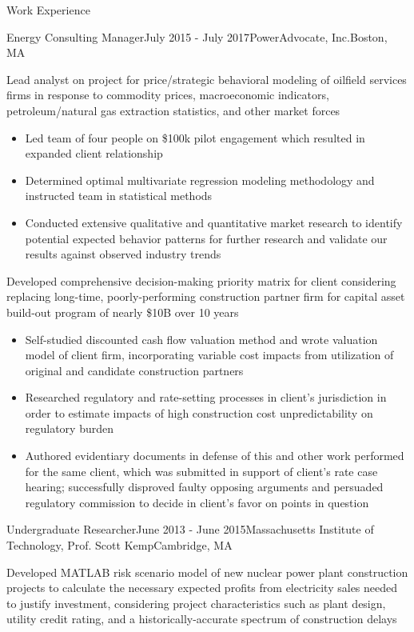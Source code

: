 \documentclass{resume} %
\begin{document}
\begin{rSection}{Work Experience}
\begin{rSubsection}{Energy Consulting Manager}{July 2015 - July 2017}{PowerAdvocate, Inc.}{Boston, MA}
  \setlength{\itemsep}{-5pt}
  \item Lead analyst on project for price/strategic behavioral modeling of oilfield services firms in response to commodity prices, macroeconomic indicators, petroleum/natural gas extraction statistics, and other market forces
  \begin{itemize}
    \item Led team of four people on \$100k pilot engagement which resulted in expanded client relationship
    \item Determined optimal multivariate regression modeling methodology and instructed team in statistical methods
    \item Conducted extensive qualitative and quantitative market research to identify potential expected behavior patterns for further research and validate our results against observed industry trends
  \end{itemize}
  \item Developed comprehensive decision-making priority matrix for client considering replacing long-time, poorly-performing construction partner firm for capital asset build-out program of nearly \$10B over 10 years
  \begin{itemize}
    \setlength{\itemsep}{-5pt}
    \item Self-studied discounted cash flow valuation method and wrote valuation model of client firm, incorporating variable cost impacts from utilization of original and candidate construction partners
    \item Researched regulatory and rate-setting processes in client's jurisdiction in order to estimate impacts of high construction cost unpredictability on regulatory burden
    \item Authored evidentiary documents in defense of this and other work performed for the same client, which was submitted in support of client's rate case hearing; successfully disproved faulty opposing arguments and persuaded regulatory commission to decide in client's favor on points in question
  \end{itemize}
\end{rSubsection}


\begin{rSubsection}{Undergraduate Researcher}{June 2013 - June 2015}{Massachusetts Institute of Technology, Prof. Scott Kemp}{Cambridge, MA}
  \item Developed MATLAB risk scenario model of new nuclear power plant construction projects to calculate the necessary expected profits from electricity sales needed to justify investment, considering project characteristics such as plant design, utility credit rating, and a historically-accurate spectrum of construction delays
\end{rSubsection}

\end{rSection}
\end{document}
